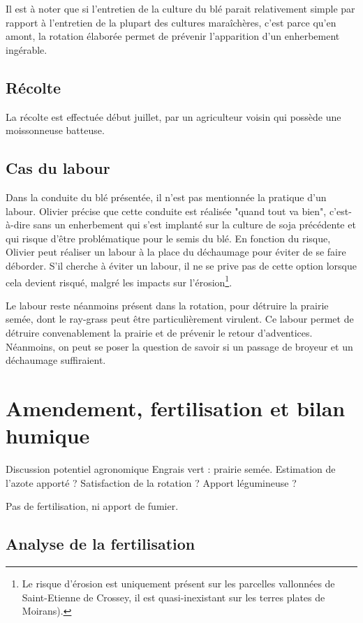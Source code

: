 \documentclass{article}
\begin{document}
Il est à noter que si l'entretien de la culture du blé parait relativement simple par rapport à l'entretien de la plupart des cultures maraîchères, c'est parce qu'en amont, la rotation élaborée permet de prévenir l'apparition d'un enherbement ingérable. 

\subsection{Récolte}

La récolte est effectuée début juillet, par un agriculteur voisin qui possède une moissonneuse batteuse. 

\subsection{Cas du labour}

Dans la conduite du blé présentée, il n'est pas mentionnée la pratique d'un labour. Olivier précise que cette conduite est réalisée "quand tout va bien", c'est-à-dire sans un enherbement qui s'est implanté sur la culture de soja précédente et qui risque d'être problématique pour le semis du blé. En fonction du risque, Olivier peut réaliser un labour à la place du déchaumage pour éviter de se faire déborder. S'il cherche à éviter un labour, il ne se prive pas de cette option lorsque cela devient risqué, malgré les impacts sur l'érosion\footnote{Le risque d'érosion est uniquement présent sur les parcelles vallonnées de Saint-Etienne de Crossey, il est quasi-inexistant sur les terres plates de Moirans).}.

Le labour reste néanmoins présent dans la rotation, pour détruire la prairie semée, dont le ray-grass peut être particulièrement virulent. Ce labour permet de détruire convenablement la prairie et de prévenir le retour d'adventices. Néanmoins, on peut se poser la question de savoir si un passage de broyeur et un déchaumage suffiraient.

\section{Amendement, fertilisation et bilan humique}

Discussion potentiel agronomique Engrais vert : prairie semée. Estimation de l'azote apporté ? Satisfaction de la rotation ? Apport légumineuse ?

Pas de fertilisation, ni apport de fumier.

\subsection{Analyse de la fertilisation}
\end{document}
